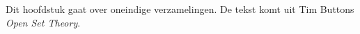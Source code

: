\documentclass[../../../include/open-logic-chapter]{subfiles}
\begin{document}

\begin{editorial}
Dit hoofdstuk gaat over oneindige verzamelingen. De tekst komt uit Tim
Buttons \emph{Open Set Theory}.
\end{editorial}

\end{document}
